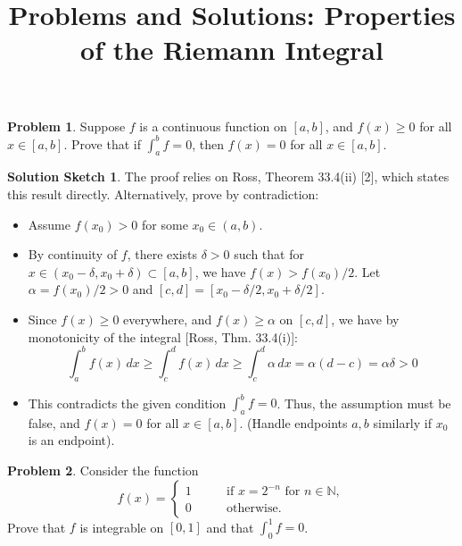 \documentclass{article}
\title{Problems and Solutions: Properties of the Riemann Integral}
\date{}
\newcommand{\N}{\mathbb{N}}
\theoremstyle{definition} %
\newtheorem{problem}{Problem}
\theoremstyle{definition} %
\newtheorem*{solution}{Solution Sketch}
\begin{document}
\maketitle

\begin{problem}
Suppose $f$ is a continuous function on $[a,b]$, and $f(x)\ge 0$ for all $x\in[a,b]$. Prove that if $\int_a^b f = 0$, then $f(x)=0$ for all $x\in[a,b]$.
\end{problem}

\begin{solution}
The proof relies on Ross, Theorem 33.4(ii) [2], which states this result directly.
Alternatively, prove by contradiction:
\begin{itemize}
    \item Assume $f(x_0) > 0$ for some $x_0 \in (a,b)$.
    \item By continuity of $f$, there exists $\delta > 0$ such that for $x \in (x_0-\delta, x_0+\delta) \subset [a,b]$, we have $f(x) > f(x_0)/2$. Let $\alpha = f(x_0)/2 > 0$ and $[c,d] = [x_0-\delta/2, x_0+\delta/2]$.
    \item Since $f(x) \ge 0$ everywhere, and $f(x) \ge \alpha$ on $[c,d]$, we have by monotonicity of the integral [Ross, Thm. 33.4(i)]:
    \[
    \int_a^b f(x) \, dx \ge \int_c^d f(x) \, dx \ge \int_c^d \alpha \, dx = \alpha (d-c) = \alpha \delta > 0
    \]
    \item This contradicts the given condition $\int_a^b f = 0$. Thus, the assumption must be false, and $f(x)=0$ for all $x \in [a,b]$. (Handle endpoints $a,b$ similarly if $x_0$ is an endpoint).
\end{itemize}
\end{solution}

\begin{problem}
Consider the function
\begin{equation*}
  f(x)=\begin{cases}
    1 & \qquad \text{if } x=2^{-n} \text{ for } n\in \N, \\
    0 & \qquad \text{otherwise.}
  \end{cases}
\end{equation*}
Prove that $f$ is integrable on $[0,1]$ and that $\int_0^1 f = 0$.
\end{problem}
\end{document}
